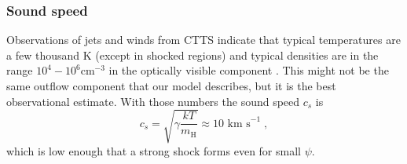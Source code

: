 \subsubsection{Sound speed}
Observations of jets and winds from CTTS indicate that typical temperatures are a few thousand K (except in shocked regions) and typical densities are in the range $10^4-10^6 \mathrm{ cm}^{-3}$ in the optically visible component \citep[e.g.][]{2000A&A...356L..41L,2007ApJ...657..897K}. This might not be the same outflow component that our model describes, but it is the best observational estimate. With those numbers the sound speed $c_s$ is
\begin{equation}
c_s = \sqrt{\gamma \frac{k T}{m_{\textrm{H}}}} \approx 10 \textrm{ km s}^{-1} \; ,
\end{equation}
which is low enough that a strong shock forms even for small $\psi$.